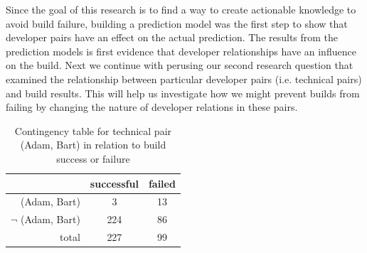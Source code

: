 Since the goal of this research is to find a way to create actionable knowledge
to avoid build failure, building a prediction model was the first step to show
that developer pairs have an effect on the actual prediction. The results from
the prediction models is first evidence that developer relationships have an
influence on the build. Next we continue with perusing our second research
question that examined the relationship between particular developer
pairs (i.e. technical pairs) and build results. This will help us
investigate how we might prevent builds from failing by changing the
nature of developer relations in these pairs.





\begin{table}[t]
\centering%
\begin{tabular}{rcc}
\toprule
 & successful & failed  \\
 \midrule
(Adam, Bart) & 3 & 13 \\
$\neg$ (Adam, Bart) & 224 & 86\\
\midrule
total&227&99\\\bottomrule
\end{tabular}
\caption{Contingency table for technical pair (Adam, Bart) in relation to build
success or failure}
\label{tab:contingencytable}
\end{table}



